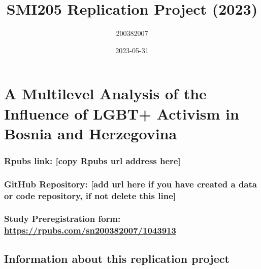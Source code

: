 \documentclass[
]{article}
\title{SMI205 Replication Project (2023)}
\author{200382007}
\date{2023-05-31}
\begin{document}
\maketitle

{
\setcounter{tocdepth}{2}
\tableofcontents
}
\hypertarget{a-multilevel-analysis-of-the-influence-of-lgbt-activism-in-bosnia-and-herzegovina}{%
\section{A Multilevel Analysis of the Influence of LGBT+ Activism in
Bosnia and
Herzegovina}\label{a-multilevel-analysis-of-the-influence-of-lgbt-activism-in-bosnia-and-herzegovina}}

\hypertarget{rpubs-link-copy-rpubs-url-address-here}{%
\subsubsection{Rpubs link: {[}copy Rpubs url address
here{]}}\label{rpubs-link-copy-rpubs-url-address-here}}

\hypertarget{github-repository-add-url-here-if-you-have-created-a-data-or-code-repository-if-not-delete-this-line}{%
\subsubsection{GitHub Repository: {[}add url here if you have created a
data or code repository, if not delete this
line{]}}\label{github-repository-add-url-here-if-you-have-created-a-data-or-code-repository-if-not-delete-this-line}}

\hypertarget{study-preregistration-form-httpsrpubs.comsn2003820071043913}{%
\subsubsection{\texorpdfstring{Study Preregistration form:
\url{https://rpubs.com/sn200382007/1043913}}{Study Preregistration form: https://rpubs.com/sn200382007/1043913}}\label{study-preregistration-form-httpsrpubs.comsn2003820071043913}}

\hypertarget{information-about-this-replication-project}{%
\subsection{Information about this replication
project}\label{information-about-this-replication-project}}
\end{document}
